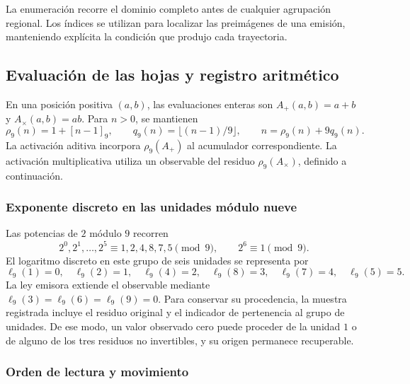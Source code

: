 La enumeración recorre el dominio completo antes de cualquier agrupación
regional. Los índices se utilizan para localizar las preimágenes de una
emisión, manteniendo explícita la condición que produjo cada trayectoria.

\subsection{Evaluación de las hojas y registro aritmético}
\label{act21:tpk:lecturas}

En una posición positiva \((a,b)\), las evaluaciones enteras son
\(A_+(a,b)=a+b\) y \(A_\times(a,b)=ab\). Para \(n>0\), se mantienen
\begin{equation}
 \rho_9(n)=1+[n-1]_9,\qquad
 q_9(n)=\lfloor(n-1)/9\rfloor,\qquad
 n=\rho_9(n)+9q_9(n).
 \label{act21:tpk:division-evaluacion}
\end{equation}
La activación aditiva incorpora \(\rho_9(A_+)\) al acumulador
correspondiente. La activación multiplicativa utiliza un observable del
residuo \(\rho_9(A_\times)\), definido a continuación.

\subsubsection{Exponente discreto en las unidades módulo nueve}

Las potencias de \(2\) módulo \(9\) recorren
\[
 2^0,2^1,\ldots,2^5\equiv1,2,4,8,7,5\pmod9,
 \qquad 2^6\equiv1\pmod9.
\]
El logaritmo discreto en este grupo de seis unidades se representa por
\begin{equation}
 \ell_9(1)=0,\quad\ell_9(2)=1,\quad\ell_9(4)=2,
 \quad\ell_9(8)=3,\quad\ell_9(7)=4,\quad\ell_9(5)=5.
 \label{act21:tpk:logaritmo}
\end{equation}
La ley emisora extiende el observable mediante
\(\ell_9(3)=\ell_9(6)=\ell_9(9)=0\). Para conservar su procedencia, la
muestra registrada incluye el residuo original y el indicador de pertenencia
al grupo de unidades. De ese modo, un valor observado cero puede proceder
de la unidad \(1\) o de alguno de los tres residuos no invertibles, y su
origen permanece recuperable.



\subsubsection{Orden de lectura y movimiento}

